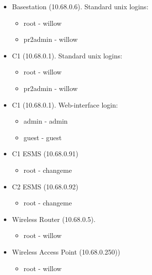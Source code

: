 \begin{itemize}
\item Basestation (10.68.0.6).  Standard unix logins:
  \begin{itemize}
  \item root - willow
  \item pr2admin - willow
  \end{itemize}
\item C1 (10.68.0.1). Standard unix logins:
  \begin{itemize}
  \item root - willow
  \item pr2admin - willow
  \end{itemize}
\item C1 (10.68.0.1). Web-interface login:
  \begin{itemize}
  \item admin - admin
  \item guest - guest
  \end{itemize}
\item C1 ESMS (10.68.0.91)
  \begin{itemize}
  \item root - changeme
  \end{itemize}
\item C2 ESMS (10.68.0.92)
  \begin{itemize}
  \item root - changeme
  \end{itemize}
\item Wireless Router (10.68.0.5).
  \begin{itemize}
  \item root - willow
  \end{itemize}
\item Wireless Access Point (10.68.0.250))
  \begin{itemize}
  \item root - willow
  \end{itemize}
\end{itemize}
